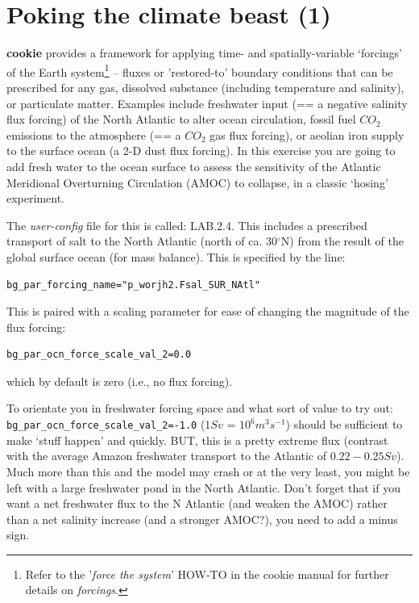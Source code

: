 \section{Poking the climate beast (1)}

\textbf{cookie} provides a framework for applying time- and spatially-variable ‘forcings’ of the Earth system\footnote{Refer to the '\textit{force the system}' \textsf{HOW-TO} in the cookie manual for further details on \textit{forcings}.} – fluxes or 'restored-to' boundary conditions that can be prescribed for any gas, dissolved substance (including temperature and salinity), or particulate matter. Examples include freshwater input (== a negative salinity flux forcing) of the North Atlantic to alter ocean circulation, fossil fuel \(CO_{2}\) emissions to the atmosphere (== a \(CO_{2}\) gas flux forcing), or aeolian iron supply to the surface ocean (a 2-D dust flux forcing). In this exercise you are going to add fresh water to the ocean surface to assess the sensitivity of the Atlantic Meridional Overturning Circulation (AMOC) to collapse, in a classic ‘hosing’ experiment. 

\vspace{1mm}
The \textit{user-config} file for this is called: \textsf{\footnotesize LAB.2.4}. This includes a prescribed transport of salt to the North Atlantic (north of ca. 30$^{\circ}$N) from the result of the global surface ocean (for mass balance). This is specified by the line:

\vspace{-2mm}\small\begin{verbatim}
bg_par_forcing_name="p_worjh2.Fsal_SUR_NAtl"
\end{verbatim}\normalsize\vspace{-2mm}

This is paired with a scaling parameter for ease of changing the magnitude of the flux forcing:

\vspace{-2mm}\small\begin{verbatim}
bg_par_ocn_force_scale_val_2=0.0
\end{verbatim}\normalsize\vspace{-2mm}

\noindent which by default is zero (i.e., no flux forcing).

\vspace{1mm}
To orientate you in freshwater forcing space and what sort of value to try out: \\\texttt{\small bg\_par\_ocn\_force\_scale\_val\_2=-1.0} ($1Sv$ = $10^{6} m^{3} s^{-1}$) should be sufficient to make ‘stuff happen’ and quickly. BUT, this is a pretty extreme flux (contrast with the average Amazon freshwater transport to the Atlantic of $0.22-0.25Sv$). Much more than this and the model may crash or at the very least, you might be left with a large freshwater pond in the North Atlantic. Don't forget that if you want a net freshwater flux to the N Atlantic (and weaken the AMOC) rather than a net salinity increase (and a stronger AMOC?), you need to add a minus sign.

